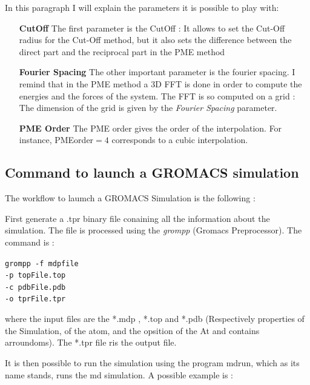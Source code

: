 \documentclass[12pt,twoside,a4paper]{report}
\begin{document}
	In this paragraph I will explain the parameters it is possible to play with:
	
	\begin{enumerate}
	

	\item[\textbf{CutOff}] The first parameter is the CutOff : It allows to set the Cut-Off radius for the Cut-Off method, but it also sets the difference between the direct part and the reciprocal part in the PME method
	
	\item[\textbf{Fourier Spacing}] The other important parameter is the fourier spacing. I remind that in the PME method a 3D FFT is done in order to compute the energies and the forces of the system. The FFT is so computed on a grid : The dimension of the grid is given by the \textit{Fourier Spacing} parameter.
	
	\item[\textbf{PME Order}] The PME order gives the order of the interpolation. For instance, PMEorder$= 4$ corresponds to a cubic interpolation. 		
	
	\end{enumerate}
	
	\subsection{Command to launch a GROMACS simulation }	
	
The workflow to laumch a GROMACS Simulation is the following : 



First generate a .tpr binary file conaining all the information about the simulation. The file is processed using the \textit{grompp} (Gromacs Preprocessor). The command is :


{\centering\tt {grompp -f mdpfile \\
	 -p topFile.top \\
	 -c pdbFile.pdb \\
	 -o tprFile.tpr \\ 
 }}

\vspace{5mm}
where the input files are the *.mdp , *.top and *.pdb (Respectively properties of the Simulation, of the atom, and the opsition of the At and contains arroundoms). The *.tpr file ris the output file.

It is then possible to run the simulation using the program mdrun, which as its name stands, runs the md simulation. A possible example is :
\end{document}
